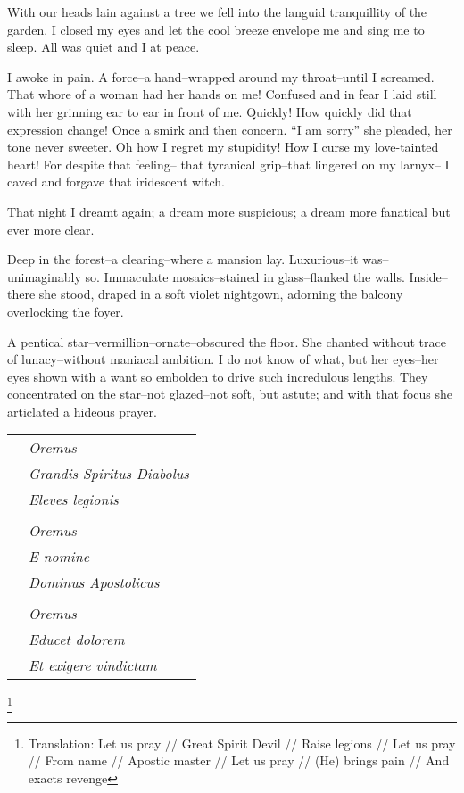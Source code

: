 \documentclass{article}
\begin{document}
With our heads lain against a tree we
fell into the languid tranquillity of the garden.
I closed my eyes and let the cool breeze envelope me
and sing me to sleep. All was quiet and I at peace.


I awoke in pain.
A force--a hand--wrapped around my throat--until I screamed.
That whore of a woman had her hands on me!
Confused and in fear I laid still
with her grinning ear to ear in front of me.
Quickly! How quickly did that expression change!
Once a smirk and then concern.
``I am sorry'' she pleaded, her tone never sweeter.
Oh how I regret my stupidity!
How I curse my love-tainted heart!
For despite that feeling--
that tyranical grip--that lingered on my larnyx--
I caved and forgave that iridescent witch.


That night I dreamt again; a dream more suspicious;
a dream more fanatical but ever more clear.
\VV


\noindent
Deep in the forest--a clearing--where a mansion lay.
Luxurious--it was--unimaginably so.
Immaculate mosaics--stained in glass--flanked the walls.
Inside--there she stood, draped in a soft violet nightgown,
adorning the balcony overlocking the foyer.


A pentical star--vermillion--ornate--obscured the floor.
She chanted without trace of lunacy--without
maniacal ambition.
I do not know of what, but her eyes--her eyes
shown with a want so embolden to drive
such incredulous lengths.
They concentrated on the star--not
glazed--not soft, but astute; and with
that focus she articlated a hideous prayer.
\VV


\singlespace
\begin{tabular}{ll}
& \textit{Oremus} \\
& \textit{Grandis Spiritus Diabolus} \\
& \textit{Eleves legionis} \\
& \\
& \textit{Oremus} \\
& \textit{E nomine} \\
& \textit{Dominus Apostolicus} \\
& \\
& \textit{Oremus} \\
& \textit{Educet dolorem} \\
& \textit{Et exigere vindictam} \\
\end{tabular}\revertspace\footnote{
Translation:
Let us pray // Great Spirit Devil // Raise legions //
Let us pray // From name // Apostic master //
Let us pray // (He) brings pain // And exacts revenge
} \vspace*{3ex}
\end{document}
